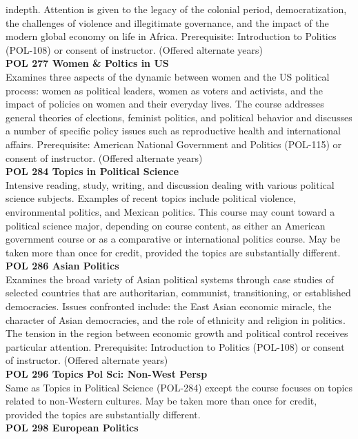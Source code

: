 \documentclass[
  letterpaper,
]{scrbook}
\begin{document}
indepth. Attention is given to the legacy of the colonial period,
democratization, the challenges of violence and illegitimate governance,
and the impact of the modern global economy on life in Africa.
Prerequisite: Introduction to Politics (POL-108) or consent of
instructor. (Offered alternate years)\\
\textbf{POL 277 Women \& Poltics in US}\\
Examines three aspects of the dynamic between women and the US political
process: women as political leaders, women as voters and activists, and
the impact of policies on women and their everyday lives. The course
addresses general theories of elections, feminist politics, and
political behavior and discusses a number of specific policy issues such
as reproductive health and international affairs. Prerequisite: American
National Government and Politics (POL-115) or consent of instructor.
(Offered alternate years)\\
\textbf{POL 284 Topics in Political Science}\\
Intensive reading, study, writing, and discussion dealing with various
political science subjects. Examples of recent topics include political
violence, environmental politics, and Mexican politics. This course may
count toward a political science major, depending on course content, as
either an American government course or as a comparative or
international politics course. May be taken more than once for credit,
provided the topics are substantially different.\\
\textbf{POL 286 Asian Politics}\\
Examines the broad variety of Asian political systems through case
studies of selected countries that are authoritarian, communist,
transitioning, or established democracies. Issues confronted include:
the East Asian economic miracle, the character of Asian democracies, and
the role of ethnicity and religion in politics. The tension in the
region between economic growth and political control receives particular
attention. Prerequisite: Introduction to Politics (POL-108) or consent
of instructor. (Offered alternate years)\\
\textbf{POL 296 Topics Pol Sci: Non-West Persp}\\
Same as Topics in Political Science (POL-284) except the course focuses
on topics related to non-Western cultures. May be taken more than once
for credit, provided the topics are substantially different.\\
\textbf{POL 298 European Politics}\\
\end{document}
